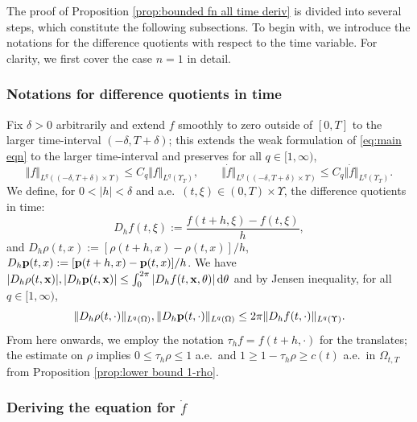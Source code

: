 \documentclass[11pt,a4paper,reqno]{amsart}
\theoremstyle{remark}
\theoremstyle{definition}
\numberwithin{equation}{section}
\newcommand{\p}{{\bf p}}
\newcommand{\x}{{\bf x}}
\newcommand{\bxi}{\xi}
\renewcommand{\d}{\, \mathrm{d} }
\begin{document}
The proof of Proposition \ref{prop:bounded fn all time deriv} is divided into several steps, which constitute the following subsections. To begin with, we introduce the notations for the difference quotients with respect to the time variable. For clarity, we first cover the case $n=1$ in detail. 

\subsubsection{Notations for difference quotients in time}\label{subsec:time diff quotients} Fix $\delta>0$ arbitrarily and extend $f$ smoothly to zero outside of $[0,T]$ to the larger time-interval $(-\delta,T+\delta)$; this extends the weak formulation of \eqref{eq:main eqn} to the larger time-interval and preserves for all $q \in [1,\infty)$, 
\begin{equation}\label{eq:diff quot basic with C}
    \Vert f \Vert_{L^q((-\delta,T+\delta)\times\Upsilon)} \leq C_q \Vert f \Vert_{L^q(\Upsilon_T)}, \qquad \Vert \dot{f} \Vert_{L^q((-\delta,T+\delta)\times\Upsilon)} \leq C_q \Vert \dot{f} \Vert_{L^q(\Upsilon_T)}. 
\end{equation}
We define, for $0<|h|<\delta$ and a.e.~$(t,\bxi) \in (0,T)\times\Upsilon$, the difference quotients in time: 
\begin{equation*}
    D_h f(t,\bxi) := \frac{f(t+h,\bxi) - f(t,\bxi)}{h}, 
\end{equation*}
and $D_h \rho(t,x) := [\rho(t+h,x) - \rho(t,x)]/{h}$, $D_h \p(t,x) := [\p(t+h,x) - \p(t,x)]/{h}$. We have $|D_h \rho(t,\x)| , |D_h \p(t,\x)| \leq \int_0^{2\pi}|D_h f(t,\x,\theta)| \d \theta$ and by Jensen inequality, for all $q \in [1,\infty)$, 
\begin{equation}\label{eq:diff quotient rho bound f}
    \Vert D_h \rho(t,\cdot) \Vert_{L^q(\Omega)} ,  \Vert D_h \p(t,\cdot) \Vert_{L^q(\Omega)} \leq 2\pi \Vert D_h f(t,\cdot) \Vert_{L^q(\Upsilon)}. 
\end{equation} 
From here onwards, we employ the notation $\tau_h f = f(t+h,\cdot)$ for the translates; the estimate on $\rho$ implies $0 \leq \tau_h \rho \leq 1$ a.e.~and $1 \geq 1- \tau_h \rho \geq c(t)$ a.e.~in $\Omega_{t,T}$ from Proposition \ref{prop:lower bound 1-rho}. 

\subsubsection{Deriving the equation for $\dot{f}$}\label{sec:deriving eqn for dot f}
\end{document}
